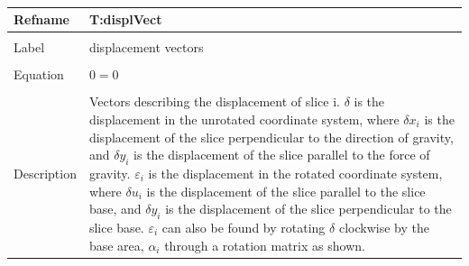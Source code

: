 \documentclass[12pt]{article}
\begin{document}
~\newline
\noindent \begin{minipage}{\textwidth}
\begin{tabular}{p{} p{}}
\toprule \textbf{Refname} & \textbf{T:displVect}
\label{T:displVect}
\\ \midrule \\
Label & displacement vectors
\\ \midrule \\
Equation & $0=0$
\\ \midrule \\
Description & Vectors describing the displacement of slice i. $\delta{}$ is the displacement in the unrotated coordinate system, where $\delta{}x_{i}$ is the displacement of the slice perpendicular to the direction of gravity, and $\delta{}y_{i}$ is the displacement of the slice parallel to the force of gravity. $\varepsilon{}_{i}$ is the displacement in the rotated coordinate system, where $\delta{}u_{i}$ is the displacement of the slice parallel to the slice base, and $\delta{}y_{i}$ is the displacement of the slice perpendicular to the slice base. $\varepsilon{}_{i}$ can also be found by rotating $\delta{}$ clockwise by the base area, $\alpha{}_{i}$ through a rotation matrix as shown.
\\ \bottomrule \end{tabular}
\end{minipage}\\
\end{document}

